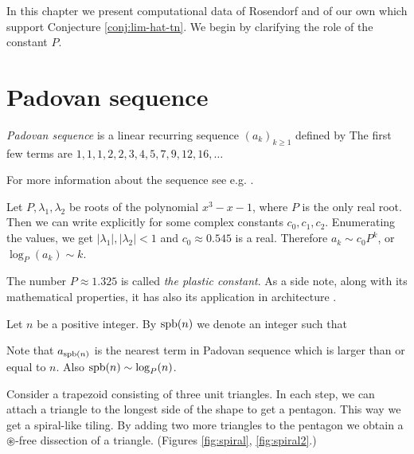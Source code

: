 In this chapter we present computational data of Rosendorf \cite{Rosendorf04} and of our own which support Conjecture \ref{conj:lim-hat-tn}. We begin by clarifying the role of the constant $P$.


\section{Padovan sequence}

\begin{defn}
\emph{Padovan sequence} is a linear recurring sequence $(a_k)_{k \geq 1}$ defined by
%
The first few terms are $1, 1, 1, 2, 2, 3, 4, 5, 7, 9, 12, 16,\dots$
\end{defn}

For more information about the sequence see e.g. \cite{OEIS}.

Let $P, \lambda_1, \lambda_2$ be roots of the polynomial $x^3-x-1$, where $P$ is the only real root. Then we can write explicitly
%
for some complex constants $c_0,c_1,c_2$. Enumerating the values, we get $|\lambda_1|, |\lambda_2| < 1$ and $c_0 \approx 0.545$ is a real. Therefore $a_k \sim c_0P^k$, or $\log_P(a_k) \sim k$.

The number $P \approx 1.325$ is called \emph{the plastic constant}. As a side note, along with its mathematical properties, it has also its application in architecture \cite{Stewart96}.

\begin{defn}
Let $n$ be a positive integer. By $\mathop{\mathrm{spb}}(n)$ we denote an integer such that
\end{defn}

Note that $a_{\mathop{\mathrm{spb}}(n)}$ is the nearest term in Padovan sequence which is larger than or equal to $n$. Also $\mathop{\mathrm{spb}}(n) \sim \log_P(n)$.

Consider a trapezoid consisting of three unit triangles. In each step, we can attach a triangle to the longest side of the shape to get a pentagon. This way we get a spiral-like tiling. By adding two more triangles to the pentagon we obtain a $\circledast$-free dissection of a triangle. (Figures \ref{fig:spiral}, \ref{fig:spiral2}.)

